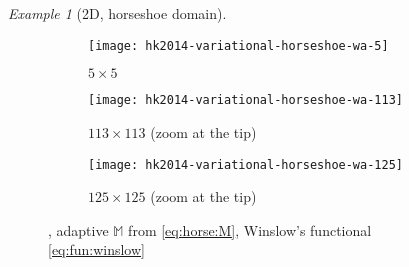 \documentclass[american]{scrartcl}
\providecommand{\M}{\mathbb{M}}
\theoremstyle{remark}
\newtheorem{example}{\hspace{1ex}Example}[section]
\begin{document}
\begin{example}[2D, horseshoe domain]
\begin{figure}[p]
   \begin{subfigure}[t]{0.31\linewidth}
      \texttt{[image: hk2014-variational-horseshoe-wa-5]}      \caption{$5 \times 5$}
   \end{subfigure}   \hfill   \begin{subfigure}[t]{0.31\linewidth}
      \texttt{[image: hk2014-variational-horseshoe-wa-113]}      \caption{$113 \times 113$ (zoom at the tip)}
   \end{subfigure}   \hfill   \begin{subfigure}[t]{0.31\linewidth}
      \texttt{[image: hk2014-variational-horseshoe-wa-125]}      \caption{$125 \times 125$ (zoom at the tip)}
   \end{subfigure}
   \caption{      ,
      adaptive $\M$ from \cref{eq:horse:M},
      Winslow's functional \cref{eq:fun:winslow}
   }\label{fig:horse:A:winslow}
\end{figure}

\end{example}
\end{document}
